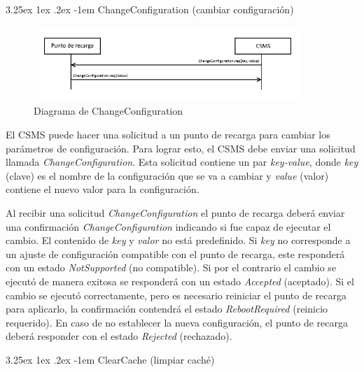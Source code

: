 \documentclass[12pt,a4paper,onecolumn,oneside]{report}
\makeatletter
\newcounter{subsubsubsection}[subsubsection]
\renewcommand\paragraph{\@startsection{paragraph}{5}{\z@}%
  {3.25ex \@plus1ex \@minus.2ex}%
  {-1em}%
  {\normalfont\normalsize\bfseries}}
\makeatother
\begin{document}
\label{Operaciones iniciadas por el CSMS}


\paragraph{ChangeConfiguration (cambiar configuración)}
\label{ChangeConfiguration (cambiar configuración)}


\begin{figure}[H] 
\centering
  \includegraphics[width=0.9\textwidth]{figuras/diagramachangeconfiguration.png}
  \caption[Diagrama de \textit{ChangeConfiguration}]{Diagrama de ChangeConfiguration\\
  }
  \label{fig:diagramachangeconfiguration}
\end{figure}

El CSMS puede hacer una solicitud a un punto de recarga para cambiar los parámetros de configuración. Para lograr esto, el CSMS debe enviar una solicitud llamada \textit{ChangeConfiguration}. Esta solicitud contiene un par \textit{key-value}, donde \textit{key} (clave) es el nombre de la configuración que se va a cambiar y \textit{value} (valor) contiene el nuevo valor para la configuración.

Al recibir una solicitud \textit{ChangeConfiguration} el punto de recarga deberá enviar una confirmación \textit{ChangeConfiguration} indicando si fue capaz de ejecutar el cambio. El contenido de \textit{key} y \textit{valor} no está predefinido. Si \textit{key} no corresponde a un ajuste de configuración compatible con el punto de recarga, este responderá con un estado \textit{NotSupported} (no compatible). Si por el contrario el cambio se ejecutó de manera exitosa se responderá con un estado \textit{Accepted} (aceptado). Si el cambio se ejecutó correctamente, pero es necesario reiniciar el punto de recarga para aplicarlo, la confirmación contendrá el estado \textit{RebootRequired} (reinicio requerido). En caso de no establecer la nueva configuración, el punto de recarga deberá responder con el estado \textit{Rejected} (rechazado).


\paragraph{ClearCache (limpiar caché)}
\label{ClearCache (limpiar caché)}
\end{document}
